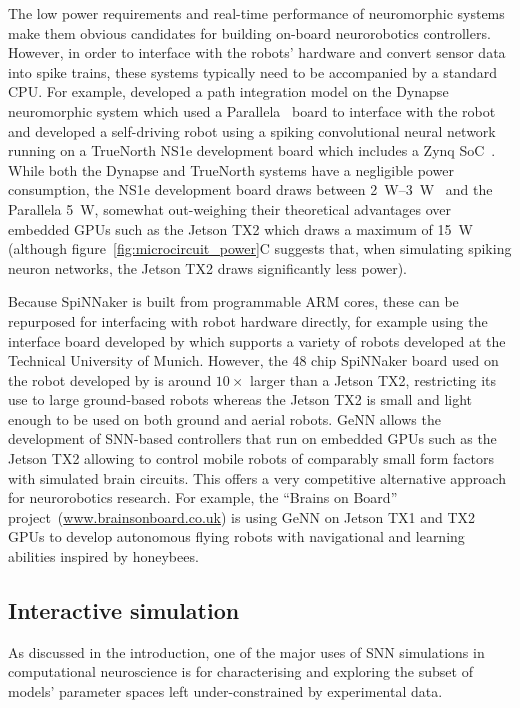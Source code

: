 \documentclass[utf8]{frontiersSCNS} %
\begin{document}
The low power requirements and real-time performance of neuromorphic systems make them obvious candidates for building on-board neurorobotics controllers.
However, in order to interface with the robots' hardware and convert sensor data into spike trains, these systems typically need to be accompanied by a standard CPU.
For example, \citet{Kreiser2018} developed a path integration model on the Dynapse~\citep{Qiao2015} neuromorphic system which used a Parallela~\citep{Olofsson2015} board to interface with the robot and \citet{Hwu2017} developed a self-driving robot using a spiking convolutional neural network running on a TrueNorth NS1e development board which includes a Zynq SoC~\citep{XilinxInc2018}.
While both the Dynapse and TrueNorth systems have a negligible power consumption, the NS1e development board draws between \SIrange{2}{3}{\watt}~\citep{Sawada2016} and the Parallela \SI{5}{\watt}, somewhat out-weighing their theoretical advantages over embedded GPUs such as the Jetson TX2 which draws a maximum of \SI{15}{\watt} (although figure~\ref{fig:microcircuit_power}C suggests that, when simulating spiking neuron networks, the Jetson TX2 draws significantly less power).

Because SpiNNaker is built from programmable ARM cores, these can be repurposed for interfacing with robot hardware directly, for example using the interface board developed by \citet{Denk2013} which supports a variety of robots developed at the Technical University of Munich.
However, the 48 chip SpiNNaker board used on the robot developed by \citet{Conradt2015} is around $10\times$ larger than a Jetson TX2, restricting its use to large ground-based robots whereas the Jetson TX2 is small and light enough to be used on both ground and aerial robots.
GeNN allows the development of SNN-based controllers that run on
embedded GPUs such as the Jetson TX2 allowing to control mobile robots
of comparably small form factors with simulated brain circuits. This
offers a very competitive alternative approach 
for neurorobotics research.
For example, the ``Brains on Board''
project~(\url{www.brainsonboard.co.uk}) is using GeNN on Jetson TX1 and TX2 GPUs to develop autonomous flying robots with navigational and learning abilities inspired by honeybees.

\subsection{Interactive simulation}
As discussed in the introduction, one of the major uses of SNN simulations in computational neuroscience is for characterising and exploring the subset of models' parameter spaces left under-constrained by experimental data.
\end{document}
